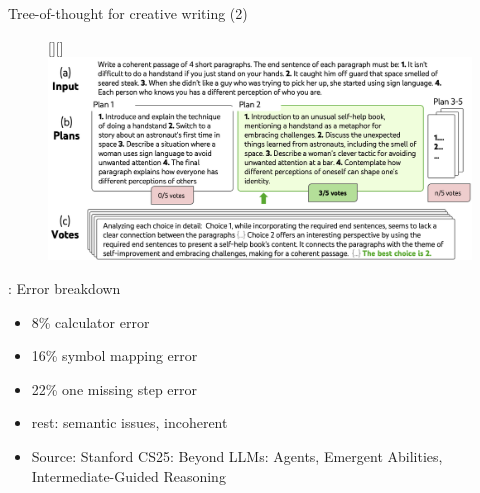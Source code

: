 \begin{vbframe}{Tree-of-thought for creative writing (2)}

\vfill
    
\begin{figure}
\raisebox{0pt}[\height][\depth]{\hspace{-0.85cm}%
    \includegraphics[width=1.15\textwidth]{figure/totcreativebig.png}
}
\end{figure}

\vfill

\end{vbframe}



\begin{frame}{\cotpfull: Error breakdown}

\vfill

\begin{itemize}
    \item 8\% calculator error
    \item 16\% symbol mapping error
    \item 22\% one missing step error
    \item rest: semantic issues, incoherent \cotp
\item Source: Stanford CS25: Beyond LLMs: Agents, Emergent
    Abilities, Intermediate-Guided Reasoning
\end{itemize}

\vfill

\end{frame}


